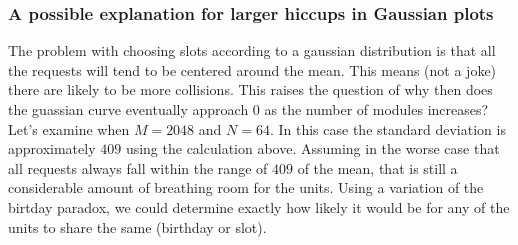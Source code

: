 \documentclass[12pt]{article}
\begin{document}
\subsubsection*{A possible explanation for larger hiccups in Gaussian plots}
The problem with choosing slots according to a gaussian distribution is that all the
requests will tend to be centered around the mean. This means (not a joke) there are likely to be more collisions. This raises the question of why then does the guassian curve 
eventually approach 0 as the number of modules increases? Let's examine when $M=2048$ and 
$N=64$. In this case the standard deviation is approximately $409$ using the calculation above. Assuming in the worse case that all requests always fall within the range of $409$
of the mean, that is still a considerable amount of breathing room for the units.
Using a variation of the birtday paradox, we could determine exactly how 
likely it would be for any of the units to share the same (birthday or slot).


\newpage

\newpage

\newpage

\newpage
\end{document}
